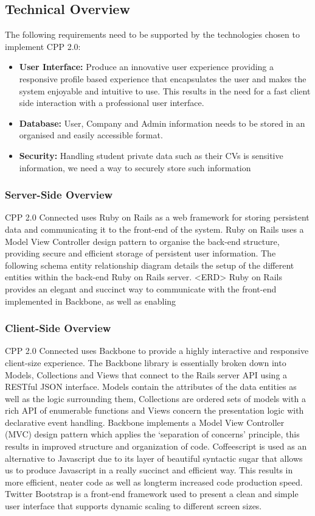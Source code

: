 \subsection{Technical Overview}
	The following requirements need to be supported by the technologies chosen to implement CPP 2.0:
		\begin{itemize}
		  \item \textbf{User Interface:} Produce an innovative user experience providing a responsive profile based experience that encapsulates the user and makes the system enjoyable and intuitive to use. This results in the need for a fast client side interaction with a professional user interface.
		  \item \textbf{Database:} User, Company and Admin information needs to be stored in an organised and easily accessible format.
		  \item \textbf{Security:} Handling student private data such as their CVs is sensitive information, we need a way to securely store such information 
		\end{itemize} 

	\subsubsection{Server-Side Overview}
		CPP 2.0 Connected uses Ruby on Rails as a web framework for storing persistent data and communicating it to the front-end of the system. Ruby on Rails uses a Model View Controller design pattern to organise the back-end structure, providing secure and efficient storage of persistent user information. The following schema entity relationship diagram details the setup of the different entities within the back-end Ruby on Rails server.
		<ERD>
		Ruby on Rails provides an elegant and succinct way to communicate with the front-end implemented in Backbone, as well as enabling  

	\subsubsection{Client-Side Overview}
		CPP 2.0 Connected uses Backbone to provide a highly interactive and responsive client-size experience. The Backbone library is essentially broken down into Models, Collections and Views that connect to the Rails server API using a RESTful JSON interface. Models contain the attributes of the data entities as well as the logic surrounding them, Collections are ordered sets of models with a rich API of enumerable functions and Views concern the presentation logic with declarative event handling. Backbone implements a Model View Controller (MVC) design pattern which applies the ‘separation of  concerns’ principle, this results in improved structure and organization of code.
		Coffeescript is used as an alternative to Javascript due to its layer of beautiful syntactic sugar that allows us to produce Javascript in a really succinct and efficient way. This results in more efficient, neater code as well as longterm increased code production speed.
		Twitter Bootstrap is a front-end framework used to present a clean and simple user interface that supports dynamic scaling to different screen sizes.